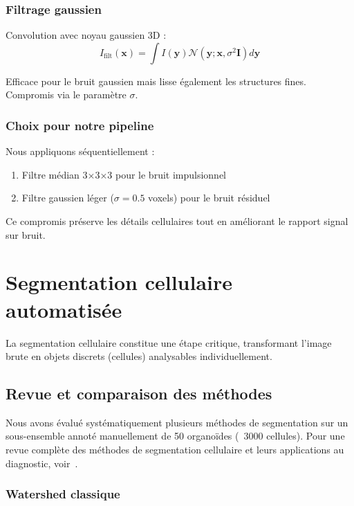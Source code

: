 \subsubsection{Filtrage gaussien}

Convolution avec noyau gaussien 3D :
\[
I_{\text{filt}}(\mathbf{x}) = \int I(\mathbf{y}) \mathcal{N}(\mathbf{y}; \mathbf{x}, \sigma^2 \mathbf{I}) d\mathbf{y}
\]

Efficace pour le bruit gaussien mais lisse également les structures fines. Compromis via le paramètre $\sigma$.

\subsubsection{Choix pour notre pipeline}

Nous appliquons séquentiellement :
\begin{enumerate}
    \item Filtre médian 3×3×3 pour le bruit impulsionnel
    \item Filtre gaussien léger ($\sigma = 0.5$ voxels) pour le bruit résiduel
\end{enumerate}

Ce compromis préserve les détails cellulaires tout en améliorant le rapport signal sur bruit.

\section{Segmentation cellulaire automatisée}

La segmentation cellulaire constitue une étape critique, transformant l'image brute en objets discrets (cellules) analysables individuellement.

\subsection{Revue et comparaison des méthodes}

Nous avons évalué systématiquement plusieurs méthodes de segmentation sur un sous-ensemble annoté manuellement de 50 organoïdes (~3000 cellules). Pour une revue complète des méthodes de segmentation cellulaire et leurs applications au diagnostic, voir~\cite{Nunes2024,Rayed2024,Wang2022Segmentation}.

\subsubsection{Watershed classique}

